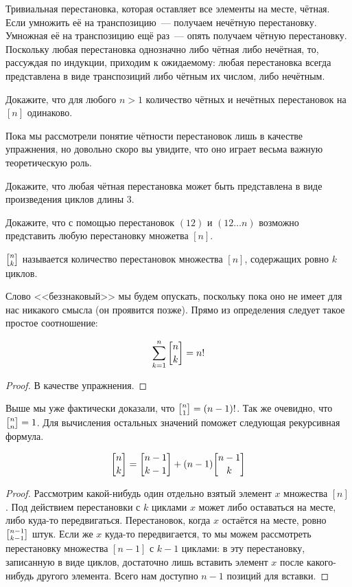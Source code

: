Тривиальная перестановка, которая оставляет все элементы на месте, чётная. Если умножить её на транспозицию~--- получаем нечётную перестановку. Умножная её на транспозицию ещё раз~--- опять получаем чётную перестановку. Поскольку любая перестановка однозначно либо чётная либо нечётная, то, рассуждая по индукции, приходим к ожидаемому: любая перестановка всегда представлена в виде транспозиций либо чётным их числом, либо нечётным.

\begin{exercise}
Докажите, что для любого $n>1$ количество чётных и нечётных перестановок на $[n]$ одинаково.
\end{exercise}

Пока мы рассмотрели понятие чётности перестановок лишь в качестве упражнения, но довольно скоро вы увидите, что оно играет весьма важную теоретическую роль.

\begin{exercise}
Докажите, что любая чётная перестановка может быть представлена в виде произведения циклов длины 3.
\end{exercise}

\begin{exercise}
Докажите, что с помощью перестановок $(12)$ и $(12\ldots n)$ возможно представить любую перестановку множетва $[n]$.
\end{exercise}

\begin{definition}
 $\fstirling{n}{k}$ называется количество перестановок множества $[n]$, содержащих ровно $k$ циклов.
\end{definition}

Слово <<беззнаковый>> мы будем опускать, поскольку пока оно не имеет для нас никакого смысла (он проявится позже). Прямо из определения следует такое простое соотношение:

\begin{thm}
$$\sum_{k=1}^n \fstirling{n}{k} = n!$$
\end{thm}
\begin{proof}
В качестве упражнения.
\end{proof}

Выше мы уже фактически доказали, что $\fstirling{n}{1} = (n-1)!$. Так же очевидно, что $\fstirling{n}{n} = 1$. Для вычисления остальных значений поможет следующая рекурсивная формула.

\begin{thm}
$$\fstirling{n}{k} = \fstirling{n-1}{k-1} + (n-1)\fstirling{n-1}{k}$$
\end{thm}
\begin{proof}
Рассмотрим какой-нибудь один отдельно взятый элемент $x$ множества $[n]$. Под действием перестановки с $k$ циклами $x$ может либо оставаться на месте, либо куда-то передвигаться. Перестановок, когда $x$ остаётся на месте, ровно $\fstirling{n-1}{k-1}$ штук. Если же $x$ куда-то передвигается, то мы можем рассмотреть перестановку множества $[n-1]$ с $k-1$ циклами: в эту перестановку, записанную в виде циклов, достаточно лишь вставить элемент $x$ после какого-нибудь другого элемента. Всего нам доступно $n-1$ позиций для вставки.
\end{proof}

